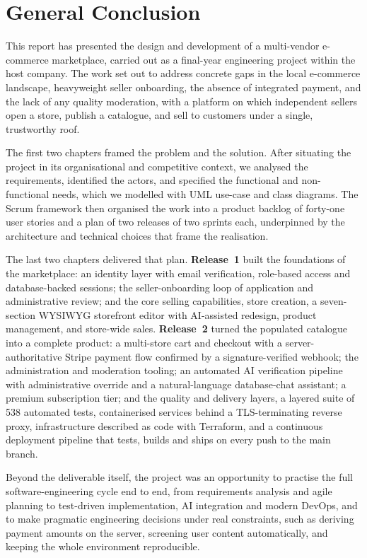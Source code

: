 \chapter*{General Conclusion}

This report has presented the design and development of a multi-vendor
e-commerce marketplace, carried out as a final-year engineering project
within the host company. The work set out to address concrete gaps in the
local e-commerce landscape, heavyweight seller onboarding, the absence
of integrated payment, and the lack of any quality moderation, with a
platform on which independent sellers open a store, publish a catalogue,
and sell to customers under a single, trustworthy roof.

The first two chapters framed the problem and the solution. After
situating the project in its organisational and competitive context, we
analysed the requirements, identified the actors, and specified the
functional and non-functional needs, which we modelled with UML use-case
and class diagrams. The Scrum framework then organised the work into a
product backlog of forty-one user stories and a plan of two releases of
two sprints each, underpinned by the architecture and technical choices
that frame the realisation.

The last two chapters delivered that plan. \textbf{Release~1} built the
foundations of the marketplace: an identity layer with email
verification, role-based access and database-backed sessions; the
seller-onboarding loop of application and administrative review; and the
core selling capabilities, store creation, a seven-section WYSIWYG
storefront editor with AI-assisted redesign, product management, and
store-wide sales. \textbf{Release~2} turned the populated catalogue into
a complete product: a multi-store cart and checkout with a
server-authoritative Stripe payment flow confirmed by a
signature-verified webhook; the administration and moderation tooling; an
automated AI verification pipeline with administrative override and a
natural-language database-chat assistant; a premium subscription tier;
and the quality and delivery layers, a layered suite of 538 automated
tests, containerised services behind a TLS-terminating reverse proxy,
infrastructure described as code with Terraform, and a continuous
deployment pipeline that tests, builds and ships on every push to the
main branch.

Beyond the deliverable itself, the project was an opportunity to practise
the full software-engineering cycle end to end, from requirements
analysis and agile planning to test-driven implementation, AI
integration and modern DevOps, and to make pragmatic engineering
decisions under real constraints, such as deriving payment amounts on the
server, screening user content automatically, and keeping the whole
environment reproducible.

